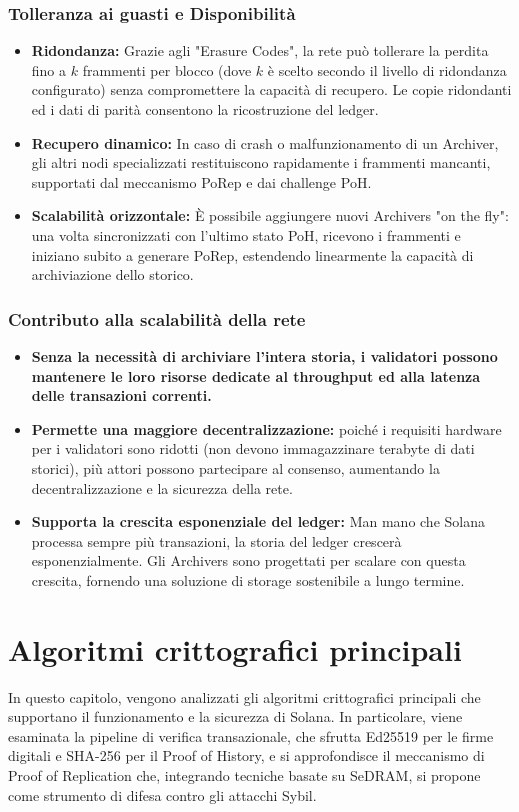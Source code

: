 \documentclass[a4paper,12pt]{report}
\begin{document}
	\subsection{Tolleranza ai guasti e Disponibilità}
	\begin{itemize}
		\item \textbf{Ridondanza:} Grazie agli "Erasure Codes", la rete può tollerare la perdita fino a \(k\) frammenti per blocco (dove \(k\) è scelto secondo il livello di ridondanza configurato) senza compromettere la capacità di recupero. Le copie ridondanti ed i dati di parità consentono la ricostruzione del ledger.
		\item \textbf{Recupero dinamico:} In caso di crash o malfunzionamento di un Archiver, gli altri nodi specializzati restituiscono rapidamente i frammenti mancanti, supportati dal meccanismo PoRep e dai challenge PoH.
		\item \textbf{Scalabilità orizzontale:} È possibile aggiungere nuovi Archivers "on the fly": una volta sincronizzati con l’ultimo stato PoH, ricevono i frammenti e iniziano subito a generare PoRep, estendendo linearmente la capacità di archiviazione dello storico.
	\end{itemize}
	
	\subsection{Contributo alla scalabilità della rete}
	\begin{itemize}
		\item \textbf{Senza la necessità di archiviare l'intera storia, i validatori possono mantenere le loro risorse dedicate al throughput ed alla latenza delle transazioni correnti.}
		\item \textbf{Permette una maggiore decentralizzazione:} poiché i requisiti hardware per i validatori sono ridotti (non devono immagazzinare terabyte di dati storici), più attori possono partecipare al consenso, aumentando la decentralizzazione e la sicurezza della rete.
		\item \textbf{Supporta la crescita esponenziale del ledger:} Man mano che Solana processa sempre più transazioni, la storia del ledger crescerà esponenzialmente. Gli Archivers sono progettati per scalare con questa crescita, fornendo una soluzione di storage sostenibile a lungo termine.
	\end{itemize}
	
	\chapter{Algoritmi crittografici principali}
	In questo capitolo, vengono analizzati gli algoritmi crittografici principali che supportano il funzionamento e la sicurezza di Solana. In particolare, viene esaminata la pipeline di verifica transazionale, che sfrutta Ed25519 per le firme digitali e SHA-256 per il Proof of History, e si approfondisce il meccanismo di Proof of Replication che, integrando tecniche basate su SeDRAM, si propone come strumento di difesa contro gli attacchi Sybil.
	
\end{document}
